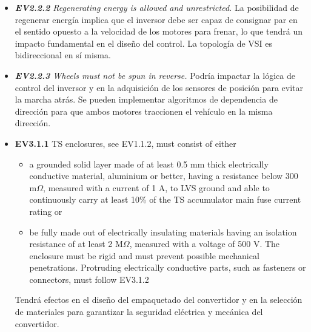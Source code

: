 \begin{itemize}

    \item \textit{\textbf{EV2.2.2} Regenerating energy is allowed and unrestricted.} La posibilidad de regenerar energía implica que el inversor debe ser capaz de consignar par en el sentido opuesto a la velocidad de los motores para frenar, lo que tendrá un impacto fundamental en el diseño del control. La topología de VSI es bidireccional en sí misma.
    \item \textit{\textbf{EV2.2.3} Wheels must not be spun in reverse.} Podría impactar la lógica de control del inversor y en la adquisición de los sensores de posición para evitar la marcha atrás. Se pueden implementar algoritmos de dependencia de dirección para que ambos motores traccionen el vehículo en la misma dirección.
    \item \begin{em} \textbf{EV3.1.1} TS enclosures, see EV1.1.2, must consist of either
    \begin{itemize}
            \item a grounded solid layer made of at least 0.5 mm thick electrically conductive material, aluminium or better, having a resistance below 300 m$\Omega$, measured with a current of 1 A, to LVS ground and able to continuously carry at least 10\% of the TS accumulator main fuse current rating or 
            \item be fully made out of electrically insulating materials having an isolation resistance of at least 2 M$\Omega$, measured with a voltage of 500 V. The enclosure must be rigid and must prevent possible mechanical penetrations. Protruding electrically conductive parts, such as fasteners or connectors, must follow EV3.1.2
    \end{itemize} \end{em}  Tendrá efectos en el diseño del empaquetado del convertidor y en la selección de materiales para garantizar la seguridad eléctrica y mecánica del convertidor.


\end{itemize}
